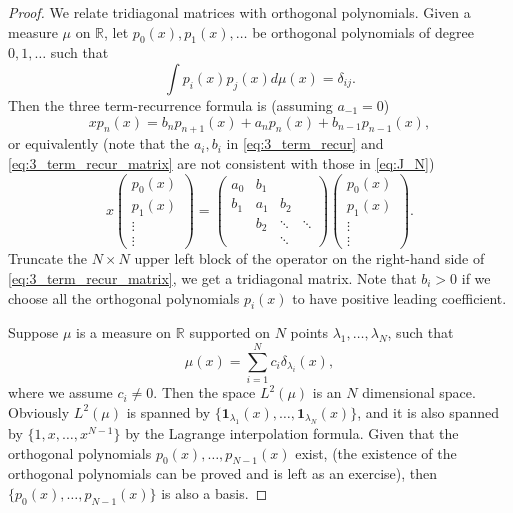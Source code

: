 \documentclass[11pt, a4paper]{article}
\numberwithin{equation}{section}
\newcommand{\id}{\mathbf{1}}
\newcommand{\realR}{\mathbb{R}}
\theoremstyle{definition}
\theoremstyle{remark}
\begin{document}
\begin{proof}
  We relate tridiagonal matrices with orthogonal polynomials. Given a measure $\mu$ on $\realR$, let $p_0(x), p_1(x), \dotsc$ be orthogonal polynomials of degree $0, 1, \dotsc$ such that
  \begin{equation} \label{eq:ortho_poly_again}
    \int p_i(x) p_j(x) d\mu(x) = \delta_{ij}.
  \end{equation}
  Then the three term-recurrence formula is (assuming $a_{-1} = 0$)
  \begin{equation} \label{eq:3_term_recur}
    x p_n(x) = b_n p_{n + 1}(x) + a_n p_n(x) + b_{n - 1} p_{n - 1}(x),
  \end{equation}
  or equivalently (note that the $a_i, b_i$ in \eqref{eq:3_term_recur} and \eqref{eq:3_term_recur_matrix} are not consistent with those in \eqref{eq:J_N})
  \begin{equation} \label{eq:3_term_recur_matrix}
    x
    \begin{pmatrix}
      p_0(x) \\
      p_1(x) \\
      \vdots \\
      \vdots
    \end{pmatrix}
    =
    \begin{pmatrix}
      a_0 & b_1 & & \\
      b_1 & a_1 & b_2 & \\
      & b_2 & \ddots & \ddots \\
      & & \ddots & 
    \end{pmatrix}
    \begin{pmatrix}
      p_0(x) \\
      p_1(x) \\
      \vdots \\
      \vdots
    \end{pmatrix}.
  \end{equation}
  Truncate the $N \times N$ upper left block of the operator on the right-hand side of \eqref{eq:3_term_recur_matrix}, we get a tridiagonal matrix. Note that $b_i > 0$ if we choose all the orthogonal polynomials $p_i(x)$ to have positive leading coefficient.
  
  Suppose $\mu$ is a measure on $\realR$ supported on $N$ points $\lambda_1, \dotsc, \lambda_N$, such that
  \begin{equation}
    \mu(x) = \sum^N_{i = 1} c_i \delta_{\lambda_i}(x),
  \end{equation}
  where we assume $c_i \neq 0$. Then the space $L^2(\mu)$ is an $N$ dimensional space. Obviously $L^2(\mu)$ is spanned by $\{\id_{\lambda_1}(x), \dotsc, \id_{\lambda_N}(x) \}$, and it is also spanned by $\{ 1, x, \dotsc, x^{N - 1} \}$ by the Lagrange interpolation formula. Given that the orthogonal polynomials $p_0(x), \dotsc, p_{N - 1}(x)$ exist, (the existence of the orthogonal polynomials can be proved and is left as an exercise), then $\{ p_0(x), \dotsc, p_{N - 1}(x) \}$ is also a basis.


\end{proof}
\end{document}

